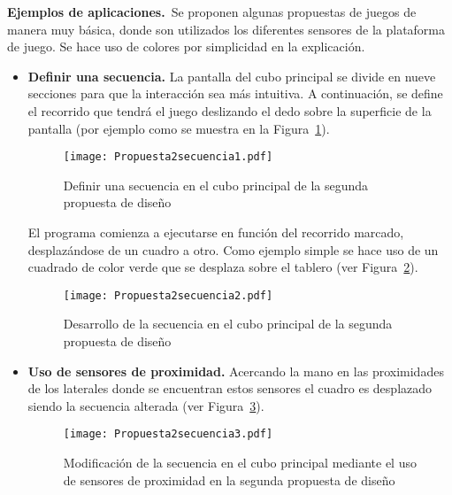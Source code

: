 \textbf{Ejemplos de aplicaciones.}\
Se proponen algunas propuestas de juegos de manera muy básica, donde son utilizados los diferentes sensores de la plataforma de juego. Se hace uso de colores por simplicidad en la explicación.

\begin{itemize}
\item \textbf{Definir una secuencia.} La pantalla del cubo principal se divide en nueve secciones para que la interacción sea más intuitiva.
A continuación, se define el recorrido que tendrá el juego deslizando el dedo sobre la
superficie de la pantalla (por ejemplo como se muestra en la Figura~\ref{fig:Propuesta2secuencia1}).
\begin{figure}[!h]
\begin{center}
\texttt{[image: Propuesta2secuencia1.pdf]}
\caption{Definir una secuencia en el cubo principal de la segunda propuesta de diseño}
\label{fig:Propuesta2secuencia1}
\end{center}
\end{figure}
El programa comienza a ejecutarse en función del recorrido marcado, desplazándose de un cuadro a otro. Como ejemplo simple se hace uso de un cuadrado de color verde que se desplaza sobre el tablero (ver Figura~\ref{fig:Propuesta2secuencia2}).\

\begin{figure}[!h]
\begin{center}
\texttt{[image: Propuesta2secuencia2.pdf]}
\caption{Desarrollo de la secuencia en el cubo principal de la segunda propuesta de diseño}
\label{fig:Propuesta2secuencia2}
\end{center}
\end{figure}

\item \textbf{Uso de sensores de proximidad.} Acercando la mano en las proximidades de los laterales donde se encuentran estos sensores el cuadro es desplazado siendo la secuencia alterada (ver Figura~\ref{fig:Propuesta2secuencia3}).\

\begin{figure}[!h]
\begin{center}
\texttt{[image: Propuesta2secuencia3.pdf]}
\caption{Modificación de la secuencia en el cubo principal mediante el uso de sensores de proximidad en la segunda propuesta de diseño}
\label{fig:Propuesta2secuencia3}
\end{center}
\end{figure}



\end{itemize}
